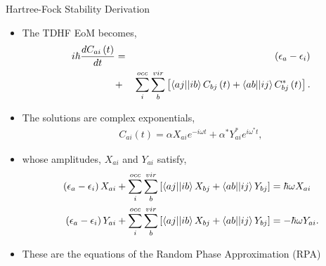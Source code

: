 \documentclass[10pt]{beamer}
\begin{document}
{{{{{{{{{{{{{{{\begin{frame}{Hartree-Fock Stability Derivation}
	\begin{itemize}[<+->]
		\item[]{The TDHF EoM becomes,
			\begin{eqnarray}
				i\hbar \frac{dC_{ai} \left(t\right) }{dt} &=& \left(\epsilon_a - \epsilon_i \right) 
				\nonumber
					\\ &+& \sum\limits_{i}^{occ}  \sum\limits_{b}^{vir}
					  \left[\braket{aj||ib}C_{bj}   \left( t \right)
						  +\braket{ab||ij}C_{bj}^* \left( t \right) \right].
			\end{eqnarray}
		}
		\item[]{The solutions are complex exponentials,
			\begin{eqnarray}
				C_{ai} \left(t \right)  = \alpha X_{ai} e^{-i \omega t} + \alpha^* Y_{ai}^* e^{i \omega^* 
				t},
			\end{eqnarray}
		}
		\item[]{whose amplitudes, $X_{ai}$ and $Y_{ai}$ satisfy,
			\begin{align}
				\left(\epsilon_a - \epsilon_i \right)X_{ai} + \sum\limits_{i}^{occ}  \sum\limits_{b}^{vir}
					\left[ \braket{aj||ib}X_{bj} + \braket{ab||ij}Y_{bj} \right] &= \hbar \omega X_{ai}
				\nonumber \\
				\left(\epsilon_a - \epsilon_i \right)Y_{ai} + \sum\limits_{i}^{occ}  \sum\limits_{b}^{vir}
					\left[ \braket{aj||ib}X_{bj} + \braket{ab||ij}Y_{bj} \right] &= -\hbar \omega Y_{ai}.
			\end{align}
		}
		\item[]{These are the equations of the Random Phase Approximation (RPA)}
	\end{itemize}
\end{frame}


{%

}}}}}}}}}}}}}}}}
\end{document}
